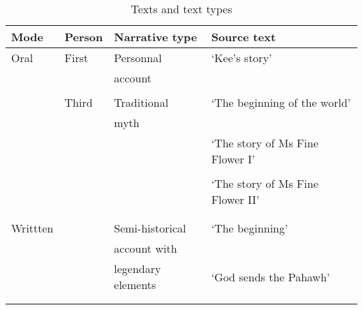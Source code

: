 \documentclass[output=paper]{LSP/langsci}
\begin{document}
\begin{table}[]
\small
\caption{Texts and text types}
\label{Jatable1}
\begin{tabular}{llll}
  \lsptoprule
Mode & Person                  & Narrative type                     & Source text                         \\
\midrule
 Oral & First  					& Personnal  						& `Kee's story'       \\
   &                     &    account                            & \citep[][Appendix B]{fuller85}                                   \\
          &                                    &        &                           \\                    
           & Third 					& Traditional 						& `The beginning of the world'                            \\
            &            &  myth                                   & \citep[][Chapter 1]{johnson92}                                        \\
             &           &                                    & `The story of Ms Fine Flower I'                                   \\
            &            &                                    & \citep[][Chapter 5]{johnson92}                                  \\
           &             &                                   & `The story of Ms Fine Flower II'                                   \\
           &             &                                    & \citep[][Chapter 6]{johnson92}                                       \\
                           &                                    &        &                           \\                                           
 Writtten  &                     &  Semi-historical                                  & `The beginning'         \\
            &            &  account with                                  & \citep[][Chapter 1]{vang90}                                      \\
            &            &  legendary elements                                  & `God sends the Pahawh'                                      \\
            &            &                                    & \citep[][Chapter 2]{vang90}                                    \\
 \lspbottomrule
\end{tabular}
\end{table}
\end{document}
